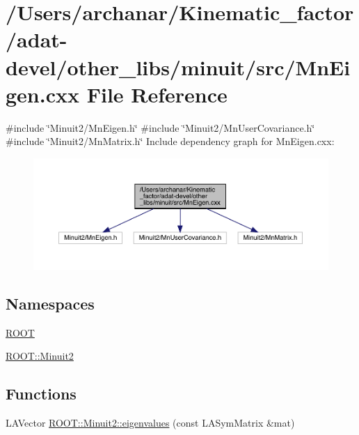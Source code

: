 \hypertarget{adat-devel_2other__libs_2minuit_2src_2MnEigen_8cxx}{}\section{/\+Users/archanar/\+Kinematic\+\_\+factor/adat-\/devel/other\+\_\+libs/minuit/src/\+Mn\+Eigen.cxx File Reference}
\label{adat-devel_2other__libs_2minuit_2src_2MnEigen_8cxx}
{\ttfamily \#include \char`\"{}Minuit2/\+Mn\+Eigen.\+h\char`\"{}}\newline
{\ttfamily \#include \char`\"{}Minuit2/\+Mn\+User\+Covariance.\+h\char`\"{}}\newline
{\ttfamily \#include \char`\"{}Minuit2/\+Mn\+Matrix.\+h\char`\"{}}\newline
Include dependency graph for Mn\+Eigen.\+cxx\+:
\nopagebreak
\begin{figure}[H]
\begin{center}
\leavevmode
\includegraphics[width=350pt]{dc/d63/adat-devel_2other__libs_2minuit_2src_2MnEigen_8cxx__incl}
\end{center}
\end{figure}
\subsection*{Namespaces}
\begin{DoxyCompactItemize}
\item 
 \mbox{\hyperlink{namespaceROOT}{R\+O\+OT}}
\item 
 \mbox{\hyperlink{namespaceROOT_1_1Minuit2}{R\+O\+O\+T\+::\+Minuit2}}
\end{DoxyCompactItemize}
\subsection*{Functions}
\begin{DoxyCompactItemize}
\item 
L\+A\+Vector \mbox{\hyperlink{namespaceROOT_1_1Minuit2_a1569bf99d4c46944433c0b5bb02b3ad6}{R\+O\+O\+T\+::\+Minuit2\+::eigenvalues}} (const L\+A\+Sym\+Matrix \&mat)
\end{DoxyCompactItemize}
